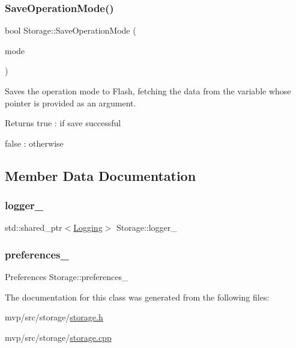 \subsubsection{\texorpdfstring{Save\+Operation\+Mode()}{SaveOperationMode()}}
{\footnotesize\ttfamily bool Storage\+::\+Save\+Operation\+Mode (\begin{DoxyParamCaption}\item[{const \hyperlink{namespaceCONFIG__SET_ac5c2592b79bead7e6497c37cddc401e6}{C\+O\+N\+F\+I\+G\+\_\+\+S\+E\+T\+::\+O\+P\+E\+R\+A\+T\+I\+O\+N\+\_\+\+M\+O\+DE} $\ast$}]{mode }\end{DoxyParamCaption})}



Saves the operation mode to Flash, fetching the data from the variable whose pointer is provided as an argument. 

\begin{DoxyReturn}{Returns}
true \+: if save successful 

false \+: otherwise 
\end{DoxyReturn}


\subsection{Member Data Documentation}
\mbox{\label{classStorage_ae18c6eef49561af14d0e08988a9def40}} 
\subsubsection{\texorpdfstring{logger\+\_\+}{logger\_}}
{\footnotesize\ttfamily std\+::shared\+\_\+ptr$<$\hyperlink{classLogging}{Logging}$>$ Storage\+::logger\+\_\+\hspace{0.3cm}{\ttfamily [private]}}

\mbox{\label{classStorage_a732ba8eb7553eb54c85f8595ff3db787}} 
\subsubsection{\texorpdfstring{preferences\+\_\+}{preferences\_}}
{\footnotesize\ttfamily Preferences Storage\+::preferences\+\_\+\hspace{0.3cm}{\ttfamily [private]}}



The documentation for this class was generated from the following files\+:\begin{DoxyCompactItemize}
\item 
mvp/src/storage/\hyperlink{storage_8h}{storage.\+h}\item 
mvp/src/storage/\hyperlink{storage_8cpp}{storage.\+cpp}\end{DoxyCompactItemize}
